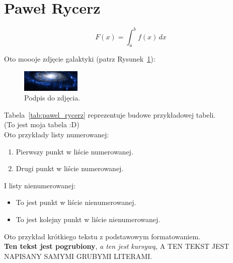 \documentclass[a4paper]{article}
\begin{document}
\section{Paweł Rycerz}
\label{sec:prycerz}



\[
F(x) = \int_{a}^{b} f(x) \, dx
\]


Oto moooje zdjęcie galaktyki (patrz Rysunek~\ref{fig:galaktyka}):
\begin{figure}[h]
    \centering
    \includegraphics[width=0.25\textwidth]{pictures/galaktyka.png}
    \caption{Podpis do zdjęcia.}
    \label{fig:galaktyka}
\end{figure}


Tabela~\ref{tab:pawel_rycerz} reprezentuje budowe przykładowej tabeli.\\
(To jest moja tabela :D) \\



Oto przykłady listy numerowanej:

\begin{enumerate}
    \item Pierwszy punkt w liście numerowanej.
    \item Drugi punkt w liście numerowanej.
\end{enumerate}

I listy nienumerowanej:

\begin{itemize}
    \item To jest punkt w liście nienumerowanej.
    \item To jest kolejny punkt w liście nienumerowanej.
\end{itemize}


Oto przykład krótkiego tekstu z podstawowym formatowaniem.\\ \textbf{Ten tekst jest pogrubiony}, \emph{a ten jest kursywą}, \MakeUppercase{a ten tekst jest napisany samymi grubymi literami.}\\
\end{document}
